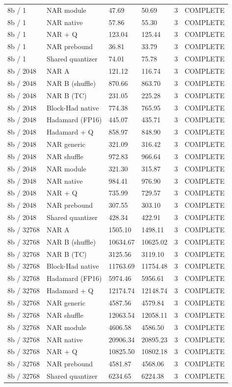 {\begin{longtable}{llllll}
8b / 1 & NAR module & 47.69 & 50.69 & 3 & COMPLETE \\
8b / 1 & NAR native & 57.86 & 55.30 & 3 & COMPLETE \\
8b / 1 & NAR + Q & 123.04 & 125.44 & 3 & COMPLETE \\
8b / 1 & NAR prebound & 36.81 & 33.79 & 3 & COMPLETE \\
8b / 1 & Shared quantizer & 74.01 & 75.78 & 3 & COMPLETE \\
8b / 2048 & NAR A & 121.12 & 116.74 & 3 & COMPLETE \\
8b / 2048 & NAR B (shuffle) & 870.66 & 863.70 & 3 & COMPLETE \\
8b / 2048 & NAR B (TC) & 231.05 & 225.28 & 3 & COMPLETE \\
8b / 2048 & Block-Had native & 774.38 & 765.95 & 3 & COMPLETE \\
8b / 2048 & Hadamard (FP16) & 445.07 & 435.71 & 3 & COMPLETE \\
8b / 2048 & Hadamard + Q & 858.97 & 848.90 & 3 & COMPLETE \\
8b / 2048 & NAR generic & 321.09 & 316.42 & 3 & COMPLETE \\
8b / 2048 & NAR shuffle & 972.83 & 966.64 & 3 & COMPLETE \\
8b / 2048 & NAR module & 321.30 & 315.87 & 3 & COMPLETE \\
8b / 2048 & NAR native & 984.41 & 976.90 & 3 & COMPLETE \\
8b / 2048 & NAR + Q & 735.99 & 729.57 & 3 & COMPLETE \\
8b / 2048 & NAR prebound & 307.55 & 303.10 & 3 & COMPLETE \\
8b / 2048 & Shared quantizer & 428.34 & 422.91 & 3 & COMPLETE \\
8b / 32768 & NAR A & 1505.10 & 1498.11 & 3 & COMPLETE \\
8b / 32768 & NAR B (shuffle) & 10634.67 & 10625.02 & 3 & COMPLETE \\
8b / 32768 & NAR B (TC) & 3125.56 & 3119.10 & 3 & COMPLETE \\
8b / 32768 & Block-Had native & 11763.69 & 11754.48 & 3 & COMPLETE \\
8b / 32768 & Hadamard (FP16) & 5974.46 & 5956.61 & 3 & COMPLETE \\
8b / 32768 & Hadamard + Q & 12174.74 & 12148.74 & 3 & COMPLETE \\
8b / 32768 & NAR generic & 4587.56 & 4579.84 & 3 & COMPLETE \\
8b / 32768 & NAR shuffle & 12063.54 & 12058.11 & 3 & COMPLETE \\
8b / 32768 & NAR module & 4606.58 & 4586.50 & 3 & COMPLETE \\
8b / 32768 & NAR native & 20906.34 & 20895.23 & 3 & COMPLETE \\
8b / 32768 & NAR + Q & 10825.50 & 10802.18 & 3 & COMPLETE \\
8b / 32768 & NAR prebound & 4581.87 & 4568.06 & 3 & COMPLETE \\
8b / 32768 & Shared quantizer & 6234.65 & 6224.38 & 3 & COMPLETE \\
\bottomrule
\end{longtable}
}
